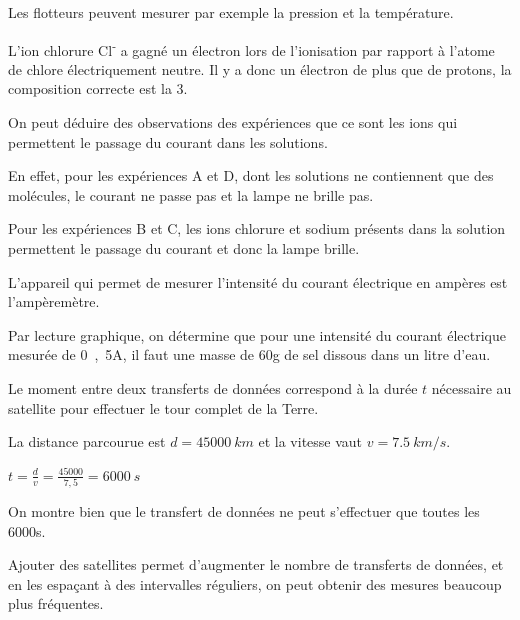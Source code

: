 \documentclass[11pt,a4paper]{article}
\begin{document}
\pagination
\titre

\q[1 point]
Les flotteurs peuvent mesurer par exemple la pression et la température.

\q[2 points]
L'ion chlorure Cl\textsuperscript{-} a gagné un électron lors de l'ionisation par rapport à l'atome de chlore électriquement neutre.
Il y a donc un électron de plus que de protons, la composition correcte est la 3.

\q[2 points]
On peut déduire des observations des expériences que ce sont les ions qui permettent le passage du courant dans les solutions.

En effet, pour les expériences A et D, dont les solutions ne contiennent que des molécules, le courant ne passe pas et la lampe ne brille pas.

Pour les expériences B et C, les ions chlorure et sodium présents dans la solution permettent le passage du courant et donc la lampe brille.

\q[1 point]
L'appareil qui permet de mesurer l'intensité du courant électrique en ampères est l'ampèremètre.

\q[1 point]
Par lecture graphique, on détermine que pour une intensité du courant électrique mesurée de \si{0,5}{A}, il faut une masse de \si{60}{g} de sel dissous dans un litre d'eau.

\q[2 points]

Le moment entre deux transferts de données correspond à la durée $t$ nécessaire au satellite pour effectuer le tour complet de la Terre.

La distance parcourue est $d = \SI{45000}{km}$ et la vitesse vaut $v = \SI{7,5}{km/s}$.

$t = \frac{d}{v} = \frac{45 000}{7,5} = \SI{6000}{s}$

On montre bien que le transfert de données ne peut s'effectuer que toutes les \si{6000}{s}.

\q[1 point]

Ajouter des satellites permet d'augmenter le nombre de transferts de données, et en les espaçant à des intervalles réguliers, on peut obtenir des mesures beaucoup plus fréquentes.
\end{document}
